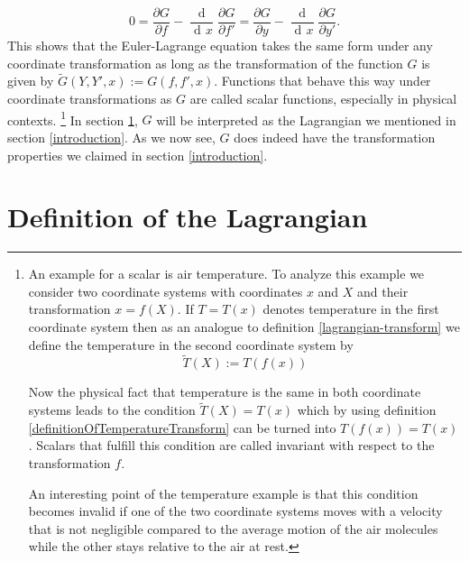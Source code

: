 \documentclass[prb,preprint]{revtex4-1}
\DeclareMathOperator{\dd}{d\!}
\DeclareMathOperator{\ddd}{\mathrm{d}}
\begin{document}
\begin{equation}
0 = \frac{\partial G}{\partial f} - \frac{\ddd}{\dd x} \frac{\partial G}{\partial f'}
= \frac{\partial G}{\partial y} - \frac{\ddd}{\dd x} \frac{\partial G}{\partial y'}.
\end{equation}
This shows that the Euler-Lagrange equation takes the same form under any coordinate transformation as long as the transformation of the function $G$ is given by $\widetilde{G}(Y,Y',x) := G(f,f',x)$. Functions that behave this way under coordinate transformations as $G$ are called scalar functions, especially in physical contexts.
\footnote{An example for a scalar is air temperature.
To analyze this example we consider two coordinate systems with coordinates $x$ and $X$ and their transformation $x=f(X)$.
If $T=T(x)$ denotes temperature in the first coordinate system then as an analogue to definition \eqref{lagrangian-transform} we define the temperature in the second coordinate system by
\begin{equation} \label{definitionOfTemperatureTransform}
  \tilde{T}(X) := T(f(x))
\end{equation}

Now the physical fact that temperature is the same in both coordinate systems leads to the condition $\tilde{T}(X) = T(x)$ which by using definition \eqref{definitionOfTemperatureTransform} can be turned into $T(f(x)) = T(x)$.
Scalars that fulfill this condition are called invariant with respect to the transformation $f$.

An interesting point of the temperature example is that this condition becomes invalid if one of the two coordinate systems moves with a velocity that is not negligible compared to the average motion of the air molecules while the other stays relative to the air at rest.
}
In section \ref{lagrangian-def}, $G$ will be interpreted as the Lagrangian we mentioned in section \ref{introduction}. As we now see, $G$ does indeed have the transformation properties we claimed in section \ref{introduction}.

\section{Definition of the Lagrangian}\label{lagrangian-def} %
\end{document}
